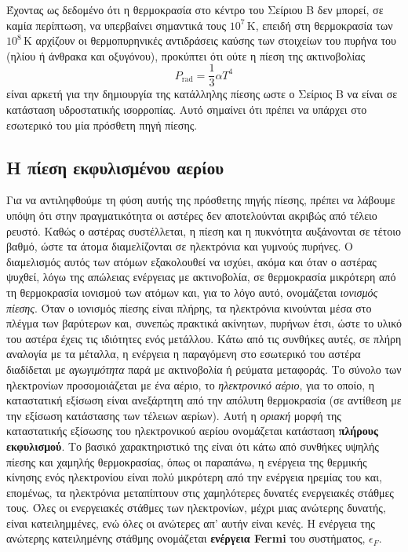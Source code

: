 Έχοντας ως δεδομένο ότι η θερμοκρασία στο κέντρο του Σείριου Β δεν μπορεί, σε καμία περίπτωση, να υπερβαίνει σημαντικά τους $10^7\,\text{K}$, επειδή στη θερμοκρασία των $10^8\,\text{K}$ αρχίζουν οι θερμοπυρηνικές αντιδράσεις καύσης των στοιχείων του πυρήνα του (ηλίου ή άνθρακα και οξυγόνου), προκύπτει ότι ούτε η πίεση της ακτινοβολίας 
 $$P_{\text{rad}} = \frac{1}{3} \alpha T^4$$
 είναι αρκετή για την δημιουργία της κατάλληλης πίεσης ωστε ο Σείριος Β να είναι σε κατάσταση υδροστατικής ισορροπίας. Αυτό σημαίνει ότι πρέπει να υπάρχει στο εσωτερικό του μία πρόσθετη πηγή πίεσης.

\subsection{Η πίεση εκφυλισμένου αερίου}
Για να αντιληφθούμε τη φύση αυτής της πρόσθετης πηγής πίεσης, πρέπει να λάβουμε υπόψη ότι στην πραγματικότητα οι αστέρες δεν αποτελούνται ακριβώς από τέλειο ρευστό. Καθώς ο αστέρας συστέλλεται, η πίεση και η πυκνότητα αυξάνονται σε τέτοιο βαθμό, ώστε τα άτομα διαμελίζονται σε ηλεκτρόνια και γυμνούς πυρήνες. Ο διαμελισμός αυτός των ατόμων εξακολουθεί να ισχύει, ακόμα και όταν ο αστέρας ψυχθεί, λόγω της απώλειας ενέργειας με ακτινοβολία, σε θερμοκρασία μικρότερη από τη θερμοκρασία ιονισμού των ατόμων και, για το λόγο αυτό, ονομάζεται \textit{ιονισμός πίεσης}. Όταν ο ιονισμός πίεσης είναι πλήρης, τα ηλεκτρόνια κινούνται μέσα στο πλέγμα των βαρύτερων και, συνεπώς πρακτικά ακίνητων, πυρήνων έτσι, ώστε το υλικό του αστέρα έχεις τις ιδιότητες ενός μετάλλου. Κάτω από τις συνθήκες αυτές, σε πλήρη αναλογία με τα μέταλλα, η ενέργεια η παραγόμενη στο εσωτερικό του αστέρα διαδίδεται με \textit{αγωγιμότητα} παρά με ακτινοβολία ή ρεύματα μεταφοράς. Το σύνολο των ηλεκτρονίων προσομοιάζεται με ένα αέριο, το \textit{ηλεκτρονικό αέριο}, για το οποίο, η καταστατική εξίσωση είναι ανεξάρτητη από την απόλυτη θερμοκρασία (σε αντίθεση με την εξίσωση κατάστασης των τέλειων αερίων). Αυτή η \textit{οριακή} μορφή της καταστατικής εξίσωσης του ηλεκτρονικού αερίου ονομάζεται κατάσταση \textbf{πλήρους εκφυλισμού}. Το βασικό χαρακτηριστικό της είναι ότι κάτω από συνθήκες υψηλής πίεσης και χαμηλής θερμοκρασίας, όπως οι παραπάνω, η ενέργεια της θερμικής κίνησης ενός ηλεκτρονίου είναι πολύ μικρότερη από την ενέργεια ηρεμίας του και, επομένως, τα ηλεκτρόνια μεταπίπτουν στις χαμηλότερες δυνατές ενεργειακές στάθμες τους. Όλες οι ενεργειακές στάθμες των ηλεκτρονίων, μέχρι μιας ανώτερης δυνατής, είναι κατειλημμένες, ενώ όλες οι ανώτερες απ' αυτήν είναι κενές. Η ενέργεια της ανώτερης κατειλημένης στάθμης ονομάζεται \textbf{ενέργεια Fermi} του συστήματος, $\epsilon_F$.

